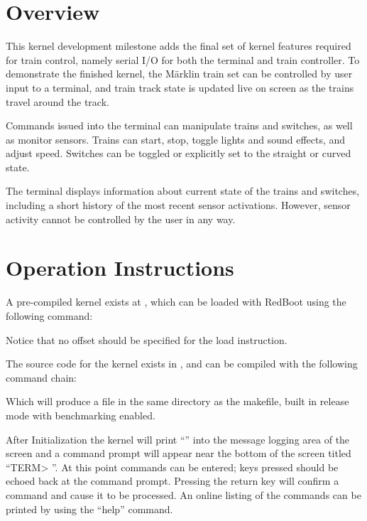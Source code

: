 \documentclass[pdftex,10pt,a4paper]{article}
\begin{document}

\section*{Overview}

This kernel development milestone adds the final set of kernel
features required for train control, namely serial I/O for both
the terminal and train controller. To demonstrate the finished kernel,
the M{\"a}rklin train set can be controlled by user input
to a terminal, and train track state is updated live on screen as the
trains travel around the track.

Commands issued into the terminal can manipulate trains and
switches, as well as monitor sensors. Trains can start, stop, toggle
lights and sound effects, and adjust speed. Switches can be toggled or
explicitly set to the straight or curved state.

The terminal displays information about current state
of the trains and switches, including a short history of the most
recent sensor activations. However, sensor activity cannot be
controlled by the user in any way.


\section*{Operation Instructions}

A pre-compiled kernel exists at
, which can be loaded with
RedBoot using the following command:

\begin{center}
\end{center}

Notice that no offset should be specified for the load instruction.

The source code for the kernel exists in ,
and can be compiled with the following command chain:

\begin{center}
\end{center}

Which will produce a  file in the same directory as
the makefile, built in release mode with benchmarking enabled.

After Initialization the kernel will print
``'' into the message logging area of
the screen and a command prompt will appear near the bottom of the
screen titled ``TERM> ''. At this point commands can be entered; keys
pressed should be echoed back at the command prompt. Pressing the
return key will confirm a command and cause it to be processed. An
online listing of the commands can be printed by using the ``help''
command.
\end{document}
